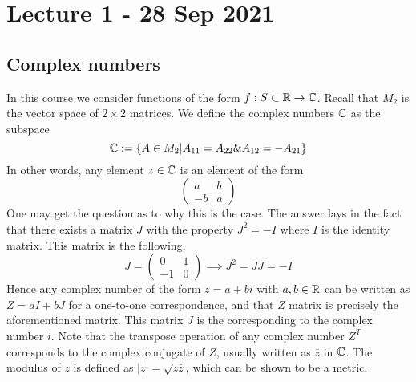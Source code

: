 \section{Lecture 1 - 28 Sep 2021}
\subsection{Complex numbers}
In this course we consider functions of the form $f:S\subset\mathbb R\to\mathbb C$. Recall that $M_2$
is the vector space of $2\times 2$ matrices. We define the complex numbers $\mathbb C$ as the
subspace 
\[\mathbb C := \left\{  A\in M_2 | A_{11} =A_{22} \& A_{12}=-A_{21} \right\}\]
In other words, any element $z\in\mathbb C$ is an element of the form
\[
\begin{pmatrix}
  a & b \\
  -b & a
\end{pmatrix}
\]
One may get the question as to why this is the case. The answer lays in the fact that
there exists a matrix $J$ with the property $J^2=-I$ where $I$ is the identity matrix.
This matrix is the following,
\[
J = \begin{pmatrix}
  0 & 1 \\
  -1 & 0
\end{pmatrix} \implies J^2 = JJ= -I
\]
Hence any complex number of the form $z=a+bi$ with $a,b\in\mathbb R$ can be written as $Z=
aI+bJ$ for a one-to-one correspondence, and that $Z$ matrix is precisely the
aforementioned matrix. This matrix $J$ is the corresponding to the complex number $i$.
Note that the transpose operation of any complex number $Z^T$ corresponds to the complex
conjugate of $Z$, usually written as $\bar{z}$ in $\mathbb C$.
The modulus of $z$ is defined as $|z|=\sqrt{z\bar{z}}$, which can be shown to be a metric.

